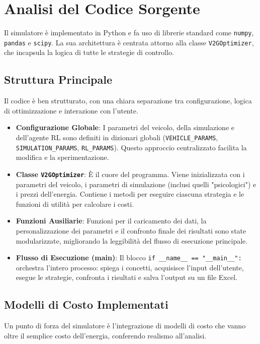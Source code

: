 \documentclass[a4paper, 11pt]{article}
\begin{document}
\section{Analisi del Codice Sorgente}
Il simulatore è implementato in Python e fa uso di librerie standard come \texttt{numpy}, \texttt{pandas} e \texttt{scipy}. La sua architettura è centrata attorno alla classe \texttt{V2GOptimizer}, che incapsula la logica di tutte le strategie di controllo.

\subsection{Struttura Principale}
Il codice è ben strutturato, con una chiara separazione tra configurazione, logica di ottimizzazione e interazione con l'utente.
\begin{itemize}
    \item \textbf{Configurazione Globale}: I parametri del veicolo, della simulazione e dell'agente RL sono definiti in dizionari globali (\texttt{VEHICLE\_PARAMS}, \texttt{SIMULATION\_PARAMS}, \texttt{RL\_PARAMS}). Questo approccio centralizzato facilita la modifica e la sperimentazione.
    \item \textbf{Classe \texttt{V2GOptimizer}}: È il cuore del programma. Viene inizializzata con i parametri del veicolo, i parametri di simulazione (inclusi quelli "psicologici") e i prezzi dell'energia. Contiene i metodi per eseguire ciascuna strategia e le funzioni di utilità per calcolare i costi.
    \item \textbf{Funzioni Ausiliarie}: Funzioni per il caricamento dei dati, la personalizzazione dei parametri e il confronto finale dei risultati sono state modularizzate, migliorando la leggibilità del flusso di esecuzione principale.
    \item \textbf{Flusso di Esecuzione (main)}: Il blocco \texttt{if \_\_name\_\_ == "\_\_main\_\_":} orchestra l'intero processo: spiega i concetti, acquisisce l'input dell'utente, esegue le strategie, confronta i risultati e salva l'output su un file Excel.
\end{itemize}

\subsection{Modelli di Costo Implementati}
Un punto di forza del simulatore è l'integrazione di modelli di costo che vanno oltre il semplice costo dell'energia, conferendo realismo all'analisi.
\end{document}
